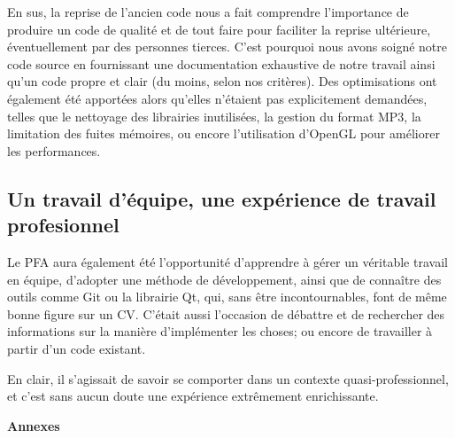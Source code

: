 \documentclass[a4paper,11pt]{article}
\begin{document}
En sus, la reprise de l'ancien code nous a fait comprendre l'importance de produire un code de qualité et de tout faire pour faciliter la reprise ultérieure, éventuellement par des personnes tierces. C'est pourquoi nous avons soigné notre code source en fournissant une documentation exhaustive de notre travail ainsi qu'un code propre et clair (du moins, selon nos critères). Des optimisations ont également été apportées alors qu'elles n'étaient pas explicitement demandées, telles que le nettoyage des librairies inutilisées, la gestion du format MP3, la limitation des fuites mémoires, ou encore l'utilisation d'OpenGL pour améliorer les performances.

\subsection*{Un travail d'équipe, une expérience de travail profesionnel}

Le PFA aura également été l'opportunité d'apprendre à gérer un véritable travail en équipe, d'adopter une méthode de développement, ainsi que de connaître des outils comme Git ou la librairie Qt, qui, sans être incontournables, font de même bonne figure sur un CV. C'était aussi l'occasion de débattre et de rechercher des informations sur la manière d'implémenter les choses; ou encore de travailler à partir d'un code existant.

En clair, il s'agissait de savoir se comporter dans un contexte quasi-professionnel, et c'est sans aucun doute une expérience extrêmement enrichissante.

\clearpage





















\begin{titlepage}
  \begin{center}
    \vspace{8cm}
    \Huge \textbf{Annexes}
  \end{center}
\end{titlepage}

\clearpage
\end{document}
